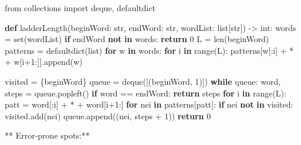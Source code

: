 \documentclass[11pt]{article}
\newenvironment{Shaded}{\begin{snugshade}}{\end{snugshade}}
\newcommand{\BuiltInTok}[1]{\textcolor[rgb]{0.50,0.55,0.55}{#1}}
\newcommand{\ControlFlowTok}[1]{\textcolor[rgb]{0.99,0.74,0.29}{\textbf{#1}}}
\newcommand{\DecValTok}[1]{\textcolor[rgb]{0.96,0.45,0.00}{#1}}
\newcommand{\ImportTok}[1]{\textcolor[rgb]{0.15,0.68,0.38}{#1}}
\newcommand{\KeywordTok}[1]{\textcolor[rgb]{0.81,0.81,0.76}{\textbf{#1}}}
\newcommand{\NormalTok}[1]{\textcolor[rgb]{0.81,0.81,0.76}{#1}}
\newcommand{\OperatorTok}[1]{\textcolor[rgb]{0.81,0.81,0.76}{#1}}
\newcommand{\StringTok}[1]{\textcolor[rgb]{0.96,0.31,0.31}{#1}}
\begin{document}
\begin{Shaded}
\begin{Highlighting}[]
\ImportTok{from}\NormalTok{ collections }\ImportTok{import}\NormalTok{ deque, defaultdict}

\KeywordTok{def}\NormalTok{ ladderLength(beginWord: }\BuiltInTok{str}\NormalTok{, endWord: }\BuiltInTok{str}\NormalTok{, wordList: }\BuiltInTok{list}\NormalTok{[}\BuiltInTok{str}\NormalTok{]) }\OperatorTok{{-}\textgreater{}} \BuiltInTok{int}\NormalTok{:}
\NormalTok{    words }\OperatorTok{=} \BuiltInTok{set}\NormalTok{(wordList)}
    \ControlFlowTok{if}\NormalTok{ endWord }\KeywordTok{not} \KeywordTok{in}\NormalTok{ words:}
        \ControlFlowTok{return} \DecValTok{0}
\NormalTok{    L }\OperatorTok{=} \BuiltInTok{len}\NormalTok{(beginWord)}
\NormalTok{    patterns }\OperatorTok{=}\NormalTok{ defaultdict(}\BuiltInTok{list}\NormalTok{)}
    \ControlFlowTok{for}\NormalTok{ w }\KeywordTok{in}\NormalTok{ words:}
        \ControlFlowTok{for}\NormalTok{ i }\KeywordTok{in} \BuiltInTok{range}\NormalTok{(L):}
\NormalTok{            patterns[w[:i] }\OperatorTok{+} \StringTok{\textquotesingle{}*\textquotesingle{}} \OperatorTok{+}\NormalTok{ w[i}\OperatorTok{+}\DecValTok{1}\NormalTok{:]].append(w)}

\NormalTok{    visited }\OperatorTok{=}\NormalTok{ \{beginWord\}}
\NormalTok{    queue }\OperatorTok{=}\NormalTok{ deque([(beginWord, }\DecValTok{1}\NormalTok{)])}
    \ControlFlowTok{while}\NormalTok{ queue:}
\NormalTok{        word, steps }\OperatorTok{=}\NormalTok{ queue.popleft()}
        \ControlFlowTok{if}\NormalTok{ word }\OperatorTok{==}\NormalTok{ endWord:}
            \ControlFlowTok{return}\NormalTok{ steps}
        \ControlFlowTok{for}\NormalTok{ i }\KeywordTok{in} \BuiltInTok{range}\NormalTok{(L):}
\NormalTok{            patt }\OperatorTok{=}\NormalTok{ word[:i] }\OperatorTok{+} \StringTok{\textquotesingle{}*\textquotesingle{}} \OperatorTok{+}\NormalTok{ word[i}\OperatorTok{+}\DecValTok{1}\NormalTok{:]}
            \ControlFlowTok{for}\NormalTok{ nei }\KeywordTok{in}\NormalTok{ patterns[patt]:}
                \ControlFlowTok{if}\NormalTok{ nei }\KeywordTok{not} \KeywordTok{in}\NormalTok{ visited:}
\NormalTok{                    visited.add(nei)}
\NormalTok{                    queue.append((nei, steps }\OperatorTok{+} \DecValTok{1}\NormalTok{))}
    \ControlFlowTok{return} \DecValTok{0}
\end{Highlighting}
\end{Shaded}

** Error-prone spots:**
\end{document}
